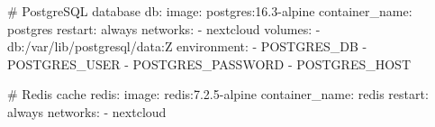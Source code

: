 \documentclass[xcolor=table,fontsize=10pt]{beamer}
\begin{document}
\begin{frame}[fragile]
{\begin{minipage}{0.55\textwidth}
\begin{adjustbox}{max width=\textwidth}
\begin{tikzpicture}
	\end{tikzpicture}
\end{adjustbox}

\end{minipage}
\begin{minipage}{0.4\textwidth}

\begin{yaml}
  # PostgreSQL database
  db:
    image: postgres:16.3-alpine
    container_name: postgres
    restart: always
    networks:
      - nextcloud
    volumes:
      - db:/var/lib/postgresql/data:Z
    environment:
      - POSTGRES_DB
      - POSTGRES_USER
      - POSTGRES_PASSWORD
      - POSTGRES_HOST

  # Redis cache
  redis:
    image: redis:7.2.5-alpine
    container_name: redis
    restart: always
    networks:
      - nextcloud
\end{yaml}

\end{minipage}

	}
\end{frame}
\end{document}
